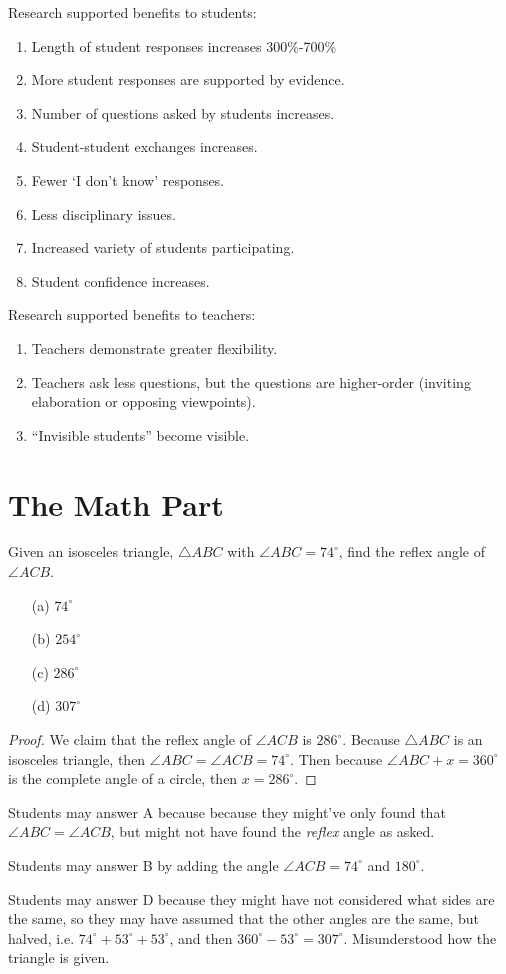 \documentclass[11pt]{amsart}
\begin{document}
Research supported benefits to students:
\begin{enumerate}
    \item Length of student responses increases 300\%-700\%
    \item More student responses are supported by evidence.
    \item Number of questions asked by students increases.
    \item Student-student exchanges increases.
    \item Fewer `I don't know' responses.
    \item Less disciplinary issues.
    \item Increased variety of students participating.
    \item Student confidence increases.
\end{enumerate}

Research supported benefits to teachers:
\begin{enumerate}
    \item Teachers demonstrate greater flexibility.
    \item Teachers ask less questions, but the questions are higher-order (inviting elaboration or opposing viewpoints).
    \item ``Invisible students'' become visible.
\end{enumerate}

\section{The Math Part}

Given an isosceles triangle, $\triangle ABC$ with $\angle ABC = 74^\circ$, find the reflex angle of $\angle ACB$.
\begin{itemize}
    \item[(a)] $74^\circ$
    \item[(b)] $254^\circ$
    \item[(c)] $286^\circ$
    \item[(d)] $307^\circ$
\end{itemize}

\begin{proof}
    We claim that the reflex angle of $\angle ACB$ is $286^\circ$. Because $\triangle ABC$ is an isosceles triangle, then $\angle ABC = \angle ACB = 74^\circ$. Then because $\angle ABC + x = 360^\circ$ is the complete angle of a circle, then $x = 286^\circ$.
\end{proof}

Students may answer A because because they might've only found that $\angle ABC = \angle ACB$, but might not have found the \emph{reflex} angle as asked.

Students may answer B by adding the angle $\angle ACB = 74^\circ$ and $180^\circ$.

Students may answer D because they might have not considered what sides are the same, so they may have assumed that the other angles are the same, but halved, i.e. $74^\circ + 53^\circ + 53^\circ$, and then $360^\circ - 53^\circ = 307^\circ$. Misunderstood how the triangle is given.
\end{document}
